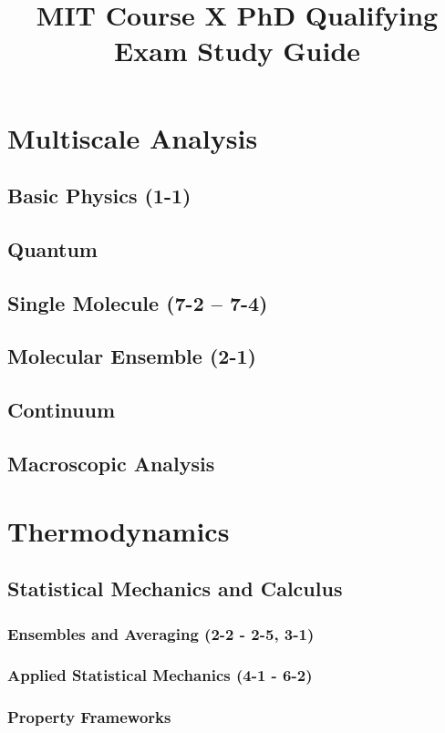 \documentclass{mitqualif}
\title{MIT Course X PhD Qualifying Exam Study Guide}
\begin{document}
\mytitlepage %
\newpage

\tableofcontents
\newpage


\chapter{Multiscale Analysis}
\section{Basic Physics (1-1)}

\section{Quantum}
\section{Single Molecule (7-2 -- 7-4)}



\section{Molecular Ensemble (2-1)}

\section{Continuum}
\section{Macroscopic Analysis}
\clearpage
\chapter{Thermodynamics}
\section{Statistical Mechanics and Calculus}
\subsection{Ensembles and Averaging (2-2 - 2-5, 3-1)}




\clearpage
\subsection{Applied Statistical Mechanics (4-1 - 6-2)}


\subsection{Property Frameworks}
\end{document}
